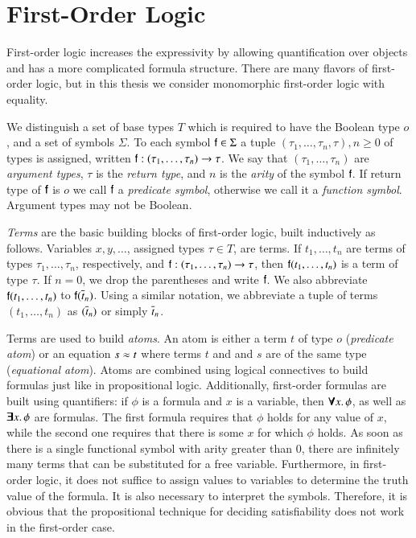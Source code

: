 \section{First-Order Logic}
\label{sec:pre:fol}

First-order logic increases the expressivity by allowing quantification over
objects and has a more complicated formula structure. There are many flavors of
first-order logic, but in this thesis we consider monomorphic first-order logic
with equality.

We distinguish a set of base types $T$ which is required to have the Boolean
type $o$, and a set of symbols $\Sigma$. To each symbol $\mathsf{f} \in \Sigma$ a
tuple $(\tau_1, \ldots, \tau_{n}, \tau), n \geq 0$ of types is assigned, written
$\mathsf{f} : (\tau_1, \ldots, \tau_{n}) \rightarrow \tau$. We say that $(\tau_1,
\ldots, \tau_{n})$ are \emph{argument types}, $\tau$ is the \emph{return type}, and $n$
is the \emph{arity} of the symbol $\mathsf{f}$. If return type of $\mathsf{f}$ is $o$ we call
$\mathsf{f}$ a \emph{predicate symbol}, otherwise we call it a \emph{function symbol}. Argument types may not be Boolean.

\emph{Terms} are the basic building blocks of first-order logic, built inductively as follows. Variables
$x,y,\ldots$, assigned types $\tau \in T$, are terms. If $t_1,\ldots,t_n$ are
terms of types $\tau_1, \ldots, \tau_n$, respectively, and $\mathsf{f} : (\tau_1,
\ldots, \tau_{n}) \rightarrow \tau$, then $\mathsf{f}(t_1, \ldots, t_n)$ is a term
of type $\tau$. If $n=0$, we drop the parentheses and write $\mathsf{f}$. We also
abbreviate $\mathsf{f}(t_1, \ldots, t_n)$ to $\mathsf{f}(\overline{t}_{n})$. Using a similar
notation, we abbreviate a tuple of terms $(t_1, \ldots, t_n)$ as $(\overline{t}_{n})$
or simply $\overline{t}_{n}$.

Terms are used to build \emph{atoms}. An atom is either a term $t$ of type $o$ (\emph{predicate atom}) or an
equation $s \approx t$ where terms $t$ and and $s$ are of the same type (\emph{equational atom}). Atoms are
combined using logical connectives to build formulas just like in propositional
logic. Additionally, first-order formulas are built using quantifiers: if $\phi$
is a formula and $x$ is a variable, then $\pmb\forall x.\, \phi$, as well as
$\pmb\exists x.\, \phi$ are formulas. The first formula requires that $\phi$ holds
for any value of $x$, while the second one requires that there is some $x$ for
which $\phi$ holds. As soon as there is a single functional symbol with arity
greater than 0, there are infinitely many terms that can be substituted for a
free variable. Furthermore, in first-order logic, it does not suffice to assign
values to variables to determine the truth value of the formula. It is also
necessary to interpret the symbols. Therefore, it is obvious that the propositional
technique for deciding satisfiability does not work in the first-order case.

